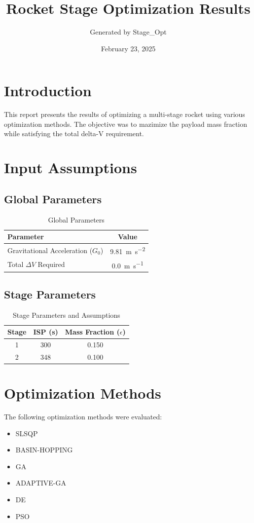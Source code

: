 \documentclass{article}
\title{Rocket Stage Optimization Results}
\author{Generated by Stage\_Opt}
\date{February 23, 2025}
\begin{document}
\maketitle

\section{Introduction}
This report presents the results of optimizing a multi-stage rocket using various optimization methods. The objective was to mazimize the payload mass fraction while satisfying the total delta-V requirement.

\section{Input Assumptions}
\subsection{Global Parameters}
\begin{table}[H]
\centering
\caption{Global Parameters}
\begin{tabular}{lS[table-format=4.2]}
\toprule
Parameter & {Value} \\
\midrule
Gravitational Acceleration ($G_0$) & \SI{9.81}{\meter\per\second\squared} \\
Total $\Delta V$ Required & \SI{0.0}{\meter\per\second} \\
\bottomrule
\end{tabular}
\end{table}

\subsection{Stage Parameters}
\begin{table}[H]
\centering
\caption{Stage Parameters and Assumptions}
\begin{tabular}{cS[table-format=3.0]S[table-format=1.3]}
\toprule
Stage & {ISP (\si{\second})} & {Mass Fraction ($\epsilon$)} \\
 & 300 & 0.150 \\
2 & 348 & 0.100 \\
\bottomrule
\end{tabular}
\end{table}

\section{Optimization Methods}
The following optimization methods were evaluated:
\begin{itemize}
\item SLSQP
\item BASIN-HOPPING
\item GA
\item ADAPTIVE-GA
\item DE
\item PSO
\end{itemize}
\end{document}
